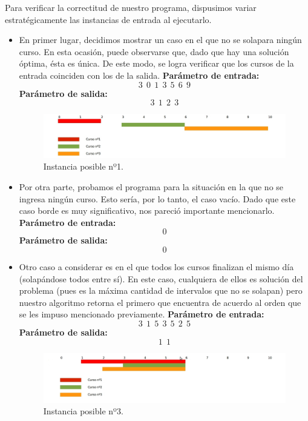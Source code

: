 Para verificar la correctitud de nuestro programa, dispusimos variar estratégicamente las instancias de entrada al ejecutarlo.
\begin{itemize}
\item En primer lugar, decidimos mostrar un caso en el que no se solapara ningún curso. En esta ocasión, puede observarse que, dado que hay una solución óptima, ésta es única. De este modo, se logra verificar que los cursos de la entrada coinciden con los de la salida.\newline
\textbf{Parámetro de entrada:} $$3\ \ 0\ \ 1\ \ 3\ \ 5\ \ 6\ \ 9$$
\textbf{Parámetro de salida:} $$3\ \ 1\ \ 2\ \ 3$$\newline


\begin{figure}[H] %
\begin{center}
\includegraphics[width=470pt]{../imgs/instancia4.jpg}
\end{center}
\caption{Instancia posible nº1.}
\end{figure}

\item Por otra parte, probamos el programa para la situación en la que no se ingresa ningún curso. Esto sería, por lo tanto, el caso vacío. Dado que este caso borde es muy significativo, nos pareció importante mencionarlo.\newline
\textbf{Parámetro de entrada:} $$0$$
\textbf{Parámetro de salida:} $$0$$ \newline


\item Otro caso a considerar es en el que todos los cursos finalizan el mismo día (solapándose todos entre sí). En este caso, cualquiera de ellos es solución del problema (pues es la máxima cantidad de intervalos que no se solapan) pero nuestro algoritmo retorna el primero que encuentra de acuerdo al orden que se les impuso mencionado previamente. \newline
\textbf{Parámetro de entrada:}  $$3\ \ 1\ \ 5\ \ 3\ \ 5\ \ 2\ \ 5$$
\textbf{Parámetro de salida:}  $$1\ \ 1$$\newline

\begin{figure}[H] %
\begin{center}
\includegraphics[width=490pt]{../imgs/instancia3.jpg}
\end{center}
\caption{Instancia posible nº3.}
\end{figure}



\end{itemize}
